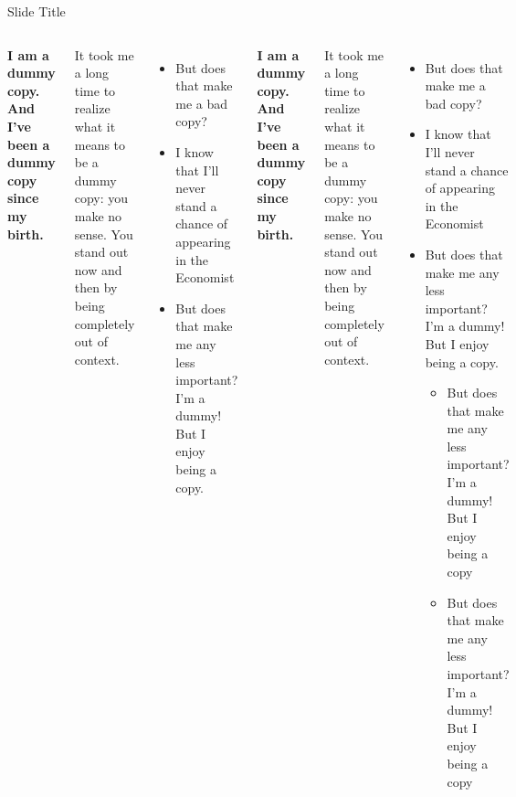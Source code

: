 \documentclass[
 UKenglish%
 ]{beamer}%
\begin{document}
\begin{frame}{Slide Title}
  \begin{columns}[onlytextwidth]
    \column[t]{0.49\hsize}\parskip\medskipamount
    {\color{KITgreen}\bfseries\Large I am a dummy copy. And I’ve been a dummy copy since my birth.\par}

    \bigskip\large
    It took me a long time to realize what it means to be a dummy copy: you make no
    sense. You stand out now and then by being completely out of context.
    
    \begin{itemize}
    \item But does that make me a bad copy?
    \item I know that I’ll never stand a chance of appearing in the Economist
    \item But does that make me any less important? I’m a dummy! But I enjoy being a copy.
    \end{itemize}

    \column[t]{0.49\hsize}\parskip\medskipamount
    {\color{KITgreen}\bfseries\Large I am a dummy copy. And I’ve been a dummy copy since my birth.\par}

    \bigskip\large
    It took me a long time to realize what it means to be a dummy copy: you make no
    sense. You stand out now and then by being completely out of context.
    
    \begin{itemize}
    \item But does that make me a bad copy?
    \item I know that I’ll never stand a chance of appearing in the Economist
    \item But does that make me any less important? I’m a dummy! But I enjoy being a copy.
      \begin{itemize}
      \item But does that make me any less important? I’m a dummy! But I enjoy being a copy
      \item But does that make me any less important? I’m a dummy! But I enjoy being a copy
      \end{itemize}
    \end{itemize}
  \end{columns}
\end{frame}
\end{document}
